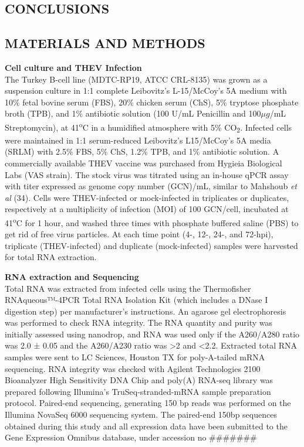 \documentclass[
]{article}
\begin{document}
\subsection{CONCLUSIONS}\label{conclusions}

\newpage

\subsection{MATERIALS AND METHODS}\label{materials-and-methods}

\textbf{Cell culture and THEV Infection}\\
The Turkey B-cell line (MDTC-RP19, ATCC CRL-8135) was grown as a
suspension culture in 1:1 complete Leibovitz's L-15/McCoy's 5A medium
with 10\% fetal bovine serum (FBS), 20\% chicken serum (ChS), 5\%
tryptose phosphate broth (TPB), and 1\% antibiotic solution (100 U/mL
Penicillin and 100\(\mu g\)/mL Streptomycin), at 41\textsuperscript{o}C
in a humidified atmosphere with 5\% CO\textsubscript{2}. Infected cells
were maintained in 1:1 serum-reduced Leibovitz's L15/McCoy's 5A media
(SRLM) with 2.5\% FBS, 5\% ChS, 1.2\% TPB, and 1\% antibiotic solution.
A commercially available THEV vaccine was purchased from Hygieia
Biological Labs (VAS strain). The stock virus was titrated using an
in-house qPCR assay with titer expressed as genome copy number (GCN)/mL,
similar to Mahshoub \emph{et al} (34). Cells were THEV-infected or
mock-infected in triplicates or duplicates, respectively at a
multiplicity of infection (MOI) of 100 GCN/cell, incubated at
41\textsuperscript{o}C for 1 hour, and washed three times with phosphate
buffered saline (PBS) to get rid of free virus particles. At each time
point (4-, 12-, 24-, and 72-hpi), triplicate (THEV-infected) and
duplicate (mock-infected) samples were harvested for total RNA
extraction.

\textbf{RNA extraction and Sequencing}\\
Total RNA was extracted from infected cells using the Thermofisher
RNAqueous™-4PCR Total RNA Isolation Kit (which includes a DNase I
digestion step) per manufacturer's instructions. An agarose gel
electrophoresis was performed to check RNA integrity. The RNA quantity
and purity was initially assessed using nanodrop, and RNA was used only
if the A260/A280 ratio was 2.0 ± 0.05 and the A260/A230 ratio was
\textgreater2 and \textless2.2. Extracted total RNA samples were sent to
LC Sciences, Houston TX for poly-A-tailed mRNA sequencing. RNA integrity
was checked with Agilent Technologies 2100 Bioanalyzer High Sensitivity
DNA Chip and poly(A) RNA-seq library was prepared following Illumina's
TruSeq-stranded-mRNA sample preparation protocol. Paired-end sequencing,
generating 150 bp reads was performed on the Illumina NovaSeq 6000
sequencing system. The paired-end 150bp sequences obtained during this
study and all expression data have been submitted to the Gene Expression
Omnibus database, under accession no \#\#\#\#\#\#\#
\end{document}
